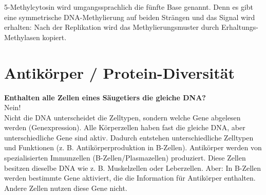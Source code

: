 
5-Methylcytosin wird umgangssprachlich die fünfte Base genannt.
Denn es gibt eine symmetrische DNA-Methylierung auf beiden Strängen und das Signal wird erhalten:
Nach der Replikation wird das Methylierungsmuster durch Erhaltungs-Methylasen kopiert. \cite{vorlesung12}


\section{Antikörper / Protein-Diversität}\label{sec:antikorper-/-protein-diversitat}
\begin{fr}
    \textbf{Enthalten alle Zellen
    eines Säugetiers die gleiche DNA?} \\
    Nein! \\ %
    Nicht die DNA unterscheidet die Zelltypen, sondern welche Gene abgelesen werden (Genexpression).
    Alle Körperzellen haben fast die gleiche DNA, aber unterschiedliche Gene sind aktiv.
    Dadurch entstehen unterschiedliche Zelltypen und Funktionen (z.
    B. Antikörperproduktion in B-Zellen).
    Antikörper werden von spezialisierten Immunzellen (B-Zellen/Plasmazellen) produziert.
    Diese Zellen besitzen dieselbe DNA wie z.
    B. Muskelzellen oder Leberzellen.
    Aber: In B-Zellen werden bestimmte Gene aktiviert, die die Information für Antikörper enthalten.
    Andere Zellen nutzen diese Gene nicht.
\end{fr}



